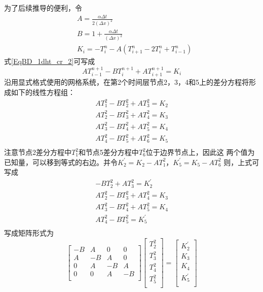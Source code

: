 为了后续推导的便利，令
\begin{equation}
\begin{aligned}
  &A = \frac{\alpha\Delta t}{2(\Delta x)^{2}} \\
  &B = 1 + \frac{\alpha\Delta t}{(\Delta x)^{2}} \\
  &K_{i} = 
  -T_{i}^{n}
  -
  A(T_{i+1}^{n} - 2T_{i}^{n} + T_{i-1}^{n})
\end{aligned}
\end{equation}
式\eqref{EqBD_1dht_cr_2}可写成
\begin{equation}
  AT_{i-1}^{n+1} - BT_{i}^{n+1} + AT_{i+1}^{n+1} = K_{i}
\end{equation}
沿用显式格式使用的网格系统，在第2个时间层节点2，3，4和5上的差分方程将形成如下的线性方程组：
\begin{equation}
\begin{aligned}
  AT_{1}^{2}-BT_{2}^{2}+AT_{3}^{2} = K_{2} \\
  AT_{2}^{2}-BT_{3}^{2}+AT_{4}^{2} = K_{3} \\
  AT_{3}^{2}-BT_{4}^{2}+AT_{5}^{2} = K_{4} \\
  AT_{4}^{2}-BT_{5}^{2}+AT_{6}^{2} = K_{5} \\
\end{aligned}
\end{equation}
注意节点2差分方程中$T_{1}^{2}$和节点5差分方程中$T_{6}^{2}$位于边界节点上，因此这
两个值为已知量，可以移到等式的右边。并令$K_{2}^{\prime}=K_{2} - AT_{1}^{2}$，$K_{5}^{\prime}=K_{5} - AT_{6}^{2}$ 则，上式可写成
\begin{equation}
\begin{aligned}
  -BT_{2}^{2}+AT_{3}^{2} = K_{2}^{\prime}\\
  AT_{2}^{2}-BT_{3}^{2}+AT_{4}^{2} = K_{3} \\
  AT_{3}^{2}-BT_{4}^{2}+AT_{5}^{2} = K_{4} \\
  AT_{4}^{2}-BT_{5}^{2} = K_{5}^{\prime}\\
\end{aligned}
\end{equation}
写成矩阵形式为
\begin{equation}
  \begin{bmatrix}
    -B & A & 0 & 0 \\
    A & -B & A & 0 \\
    0 & A & -B & A \\
    0 & 0 & A & -B \\
  \end{bmatrix}
  \begin{bmatrix}
    T_{2}^{2} \\
    T_{3}^{2} \\
    T_{4}^{2} \\
    T_{5}^{2} \\
  \end{bmatrix}
  =
  \begin{bmatrix}
    K_{2}^{\prime} \\
    K_{3} \\
    K_{4} \\
    K_{5}^{\prime} \\
  \end{bmatrix}
\end{equation}

